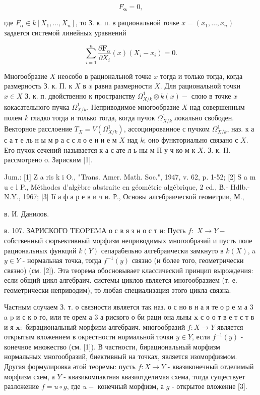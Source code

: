\documentclass[10pt]{article}
\begin{document}
\[

F_{\boldsymbol{\alpha}}=0,

\]



где $F_{\alpha} \in k\left[X_{1}, \ldots, X_{n}\right]$, то З. к. п. в рациональной точке $x=\left(x_{1}, \ldots, x_{n}\right)$ задается системой линейных уравнений



\[

\sum_{i=1}^{n} \frac{\partial \boldsymbol{F}_{\alpha}}{\partial X_{i}}(x)\left(X_{i}-x_{i}\right)=0 .

\]



Многообразие $X$ неособо в рациональной точке $x$ тогда и только тогда, когда размерность З. к. П. к $X$ в $x$ равна размерности $X$. Для рациональной точки $x \in X$ З. к. п. двойственно к пространству $\Omega_{X / k}^{1} \otimes k(x)-$ слою в точке $x$ кокасательного пучка $\Omega_{X / k}^{1}$. Неприводимое многообразие $X$ над совершенным полем $k$ гладко тогда и только тогда, когда пучок $\Omega_{X / k}^{1}$ локально свободен. Векторное расслоение $T_{X}=V\left(\Omega_{X / k}^{1}\right)$, ассоциированное с пучком $\Omega_{X / k}^{1}$, наз. к а с а т е ль н ы м р а с с л о е н и е м $X$ над $k$; оно функториально связано с $X$. Его пучок сечений называется к а с ате л ь ны м П у ч ко м к $X$. З. к. П. рассмотрено о. Зариским [1].



Jum.: [1] Z a ris k i O., "Trans. Amer. Math. Soc.", 1947, v. 62, p. 1-52; [2] S a m u e l P., Méthodes d'algèbre abstraite en géométrie algébrique, 2 ed., В.- Hdlb.- N.Y., 1967; [3] Iї а ф а р е в и ч и. Р., Основы алгебраической геометрии, М.,

в. И. Данилов.

в. 107. ЗАРИСКОГО TEOPEMА о с в я з н о с т и: Пусть $f:$ $X \rightarrow Y-$ собственный сюръективный морфизм неприводимых многообразий и пусть поле рациональных функций $k(Y)$ сепарабельно алгебраически замкнуто в $k(X)$, a $y \in Y$ - нормальная точка, тогда $f^{-1}(y)$ связно (и более того, геометрически связно) (см. [2]). Эта теорема обосновывает классический принцип вырождения: если общий цикл алгебраич. системы циклов является многообразием (т. е. геометрически неприводим), то любая специализация этого цикла связна.



Частным случаем З. т. о связности является так наз. о с но в н а я те о р е м а 3 a p и с к о го, или те орем а 3 а риского о би раци она льны $\mathbf{x}$ с о о т в е т с т в и я $\mathbf{x}:$ бирациональный морфизм алгебраич. многообразий $f: X \rightarrow Y$ является открытым вложением в окрестности нормальной точки $y \in Y$, если $f^{-1}(y)$ - конечное множество (см. [1]). В частности, бирациональный морфизм нормальных многообразий, биективный на точках, является изоморфизмом. Другая формулировка әтой теоремы: пусть $f: X \rightarrow Y$ - квазиконечный отделимый морфизм схем, а $Y$ - квазикомпактная квазиотделимая схема, тогда существует разложение $f=u \circ g$, где $u-$ конечный морфизм, а $g$ - открытое вложение [3].
\end{document}

